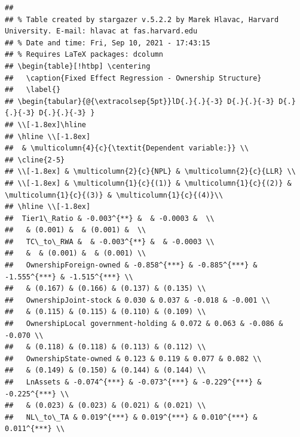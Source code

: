 \documentclass{article}
\begin{document}
\begin{verbatim}
## 
## % Table created by stargazer v.5.2.2 by Marek Hlavac, Harvard University. E-mail: hlavac at fas.harvard.edu
## % Date and time: Fri, Sep 10, 2021 - 17:43:15
## % Requires LaTeX packages: dcolumn 
## \begin{table}[!htbp] \centering 
##   \caption{Fixed Effect Regression - Ownership Structure} 
##   \label{} 
## \begin{tabular}{@{\extracolsep{5pt}}lD{.}{.}{-3} D{.}{.}{-3} D{.}{.}{-3} D{.}{.}{-3} } 
## \\[-1.8ex]\hline 
## \hline \\[-1.8ex] 
##  & \multicolumn{4}{c}{\textit{Dependent variable:}} \\ 
## \cline{2-5} 
## \\[-1.8ex] & \multicolumn{2}{c}{NPL} & \multicolumn{2}{c}{LLR} \\ 
## \\[-1.8ex] & \multicolumn{1}{c}{(1)} & \multicolumn{1}{c}{(2)} & \multicolumn{1}{c}{(3)} & \multicolumn{1}{c}{(4)}\\ 
## \hline \\[-1.8ex] 
##  Tier1\_Ratio & -0.003^{**} &  & -0.0003 &  \\ 
##   & (0.001) &  & (0.001) &  \\ 
##   TC\_to\_RWA &  & -0.003^{**} &  & -0.0003 \\ 
##   &  & (0.001) &  & (0.001) \\ 
##   OwnershipForeign-owned & -0.858^{***} & -0.885^{***} & -1.555^{***} & -1.515^{***} \\ 
##   & (0.167) & (0.166) & (0.137) & (0.135) \\ 
##   OwnershipJoint-stock & 0.030 & 0.037 & -0.018 & -0.001 \\ 
##   & (0.115) & (0.115) & (0.110) & (0.109) \\ 
##   OwnershipLocal government-holding & 0.072 & 0.063 & -0.086 & -0.070 \\ 
##   & (0.118) & (0.118) & (0.113) & (0.112) \\ 
##   OwnershipState-owned & 0.123 & 0.119 & 0.077 & 0.082 \\ 
##   & (0.149) & (0.150) & (0.144) & (0.144) \\ 
##   LnAssets & -0.074^{***} & -0.073^{***} & -0.229^{***} & -0.225^{***} \\ 
##   & (0.023) & (0.023) & (0.021) & (0.021) \\ 
##   NL\_to\_TA & 0.019^{***} & 0.019^{***} & 0.010^{***} & 0.011^{***} \\ 

\end{verbatim}
\end{document}
